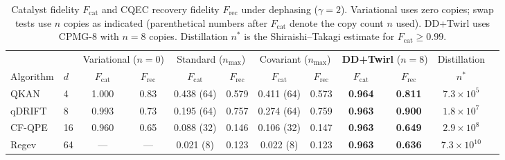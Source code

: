 \documentclass[prx,twocolumn,superscriptaddress,longbibliography,floatfix]{revtex4-2}
\begin{document}
\begin{table}[t]
\caption{Catalyst fidelity $F_\mathrm{cat}$ and CQEC recovery fidelity $F_\mathrm{rec}$ under dephasing ($\gamma = 2$). Variational uses zero copies; swap tests use $n$ copies as indicated (parenthetical numbers after $F_\mathrm{cat}$ denote the copy count $n$ used). DD+Twirl uses CPMG-8 with $n = 8$ copies. Distillation $n^*$ is the Shiraishi--Takagi estimate for $F_\mathrm{cat} \geq 0.99$.}
\label{tab:main}
\begin{ruledtabular}
\begin{tabular}{llcccccccccc}
& & \multicolumn{2}{c}{Variational ($n = 0$)} & \multicolumn{2}{c}{Standard ($n_\mathrm{max}$)} & \multicolumn{2}{c}{Covariant ($n_\mathrm{max}$)} & \multicolumn{2}{c}{\textbf{DD+Twirl} ($n = 8$)} & Distillation \\
Algorithm & $d$ & $F_\mathrm{cat}$ & $F_\mathrm{rec}$ & $F_\mathrm{cat}$ & $F_\mathrm{rec}$ & $F_\mathrm{cat}$ & $F_\mathrm{rec}$ & $F_\mathrm{cat}$ & $F_\mathrm{rec}$ & $n^*$ \\
\colrule
QKAN & 4 & 1.000 & 0.83 & 0.438 (64) & 0.579 & 0.411 (64) & 0.573 & \textbf{0.964} & \textbf{0.811} & $7.3 \times 10^5$ \\
qDRIFT & 8 & 0.993 & 0.73 & 0.195 (64) & 0.757 & 0.274 (64) & 0.759 & \textbf{0.963} & \textbf{0.900} & $1.8 \times 10^7$ \\
CF-QPE & 16 & 0.960 & 0.65 & 0.088 (32) & 0.146 & 0.106 (32) & 0.147 & \textbf{0.963} & \textbf{0.649} & $2.9 \times 10^8$ \\
Regev & 64 & --- & --- & 0.021 (8) & 0.123 & 0.022 (8) & 0.123 & \textbf{0.963} & \textbf{0.636} & $7.3 \times 10^{10}$ \\
\end{tabular}
\end{ruledtabular}
\end{table}
\end{document}

